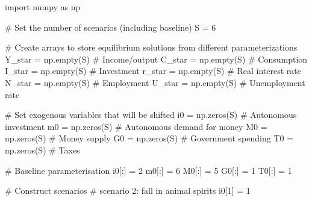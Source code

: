 \documentclass[
  letterpaper,
  DIV=11,
  numbers=noendperiod]{scrreprt}
\newenvironment{Shaded}{\begin{snugshade}}{\end{snugshade}}
\newcommand{\CommentTok}[1]{\textcolor[rgb]{0.37,0.37,0.37}{#1}}
\newcommand{\DecValTok}[1]{\textcolor[rgb]{0.68,0.00,0.00}{#1}}
\newcommand{\ImportTok}[1]{\textcolor[rgb]{0.00,0.46,0.62}{#1}}
\newcommand{\NormalTok}[1]{\textcolor[rgb]{0.00,0.23,0.31}{#1}}
\newcommand{\OperatorTok}[1]{\textcolor[rgb]{0.37,0.37,0.37}{#1}}
\begin{document}
\begin{tcolorbox}[enhanced jigsaw, titlerule=0mm, breakable, bottomrule=.15mm, toprule=.15mm, colbacktitle=quarto-callout-note-color!10!white, rightrule=.15mm, toptitle=1mm, opacityback=0, left=2mm, coltitle=black, title=\textcolor{quarto-callout-note-color}{\faInfo}\hspace{0.5em}{Python code}, colframe=quarto-callout-note-color-frame, opacitybacktitle=0.6, leftrule=.75mm, bottomtitle=1mm, arc=.35mm, colback=white]

\begin{Shaded}
\begin{Highlighting}[]
\ImportTok{import}\NormalTok{ numpy }\ImportTok{as}\NormalTok{ np}

\CommentTok{\# Set the number of scenarios (including baseline)}
\NormalTok{S }\OperatorTok{=} \DecValTok{6}

\CommentTok{\# Create arrays to store equilibrium solutions from different parameterizations}
\NormalTok{Y\_star }\OperatorTok{=}\NormalTok{ np.empty(S)  }\CommentTok{\# Income/output}
\NormalTok{C\_star }\OperatorTok{=}\NormalTok{ np.empty(S)  }\CommentTok{\# Consumption}
\NormalTok{I\_star }\OperatorTok{=}\NormalTok{ np.empty(S)  }\CommentTok{\# Investment}
\NormalTok{r\_star }\OperatorTok{=}\NormalTok{ np.empty(S)  }\CommentTok{\# Real interest rate}
\NormalTok{N\_star }\OperatorTok{=}\NormalTok{ np.empty(S)  }\CommentTok{\# Employment}
\NormalTok{U\_star }\OperatorTok{=}\NormalTok{ np.empty(S)  }\CommentTok{\# Unemployment rate}

\CommentTok{\# Set exogenous variables that will be shifted}
\NormalTok{i0 }\OperatorTok{=}\NormalTok{ np.zeros(S)  }\CommentTok{\# Autonomous investment}
\NormalTok{m0 }\OperatorTok{=}\NormalTok{ np.zeros(S)  }\CommentTok{\# Autonomous demand for money}
\NormalTok{M0 }\OperatorTok{=}\NormalTok{ np.zeros(S)  }\CommentTok{\# Money supply}
\NormalTok{G0 }\OperatorTok{=}\NormalTok{ np.zeros(S)  }\CommentTok{\# Government spending}
\NormalTok{T0 }\OperatorTok{=}\NormalTok{ np.zeros(S)  }\CommentTok{\# Taxes}

\CommentTok{\# Baseline parameterisation}
\NormalTok{i0[:] }\OperatorTok{=} \DecValTok{2}
\NormalTok{m0[:] }\OperatorTok{=} \DecValTok{6}
\NormalTok{M0[:] }\OperatorTok{=} \DecValTok{5}
\NormalTok{G0[:] }\OperatorTok{=} \DecValTok{1}
\NormalTok{T0[:] }\OperatorTok{=} \DecValTok{1}

\CommentTok{\# Construct scenarios}
\CommentTok{\# scenario 2: fall in animal spirits}
\NormalTok{i0[}\DecValTok{1}\NormalTok{] }\OperatorTok{=} \DecValTok{1}


\end{Highlighting}
\end{Shaded}
\end{tcolorbox}
\end{document}
